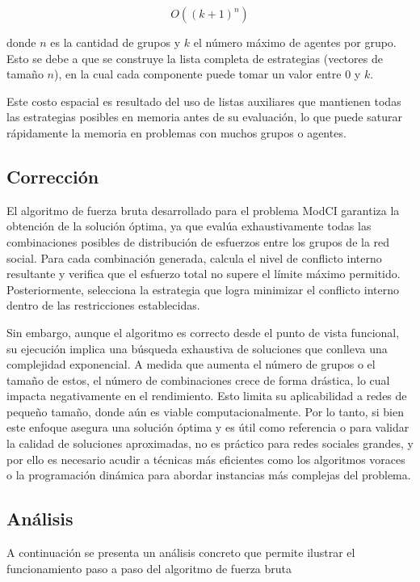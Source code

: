 \documentclass[11pt,letter]{article}
\begin{document}
\[
{O}\left((k+1)^n\right)
\]

donde $n$ es la cantidad de grupos y $k$ el número máximo de agentes por grupo. Esto se debe a que se construye la lista completa de estrategias (vectores de tamaño $n$), en la cual cada componente puede tomar un valor entre $0$ y $k$.

Este costo espacial es resultado del uso de listas auxiliares que mantienen todas las estrategias posibles en memoria antes de su evaluación, lo que puede saturar rápidamente la memoria en problemas con muchos grupos o agentes.

\subsection{Corrección}

El algoritmo de fuerza bruta desarrollado para el problema ModCI garantiza la 
obtención de la solución óptima, ya que evalúa exhaustivamente todas las 
combinaciones posibles de distribución de esfuerzos entre los grupos de la red 
social. Para cada combinación generada, calcula el nivel de conflicto interno 
resultante y verifica que el esfuerzo total no supere el límite máximo permitido. 
Posteriormente, selecciona la estrategia que logra minimizar el conflicto interno 
dentro de las restricciones establecidas. 

Sin embargo, aunque el algoritmo es correcto desde el punto de vista funcional, su 
ejecución implica una búsqueda exhaustiva de soluciones que conlleva una 
complejidad exponencial. A medida que aumenta el número de grupos o el tamaño 
de estos, el número de combinaciones crece de forma drástica, lo cual impacta 
negativamente en el rendimiento. Esto limita su aplicabilidad a redes de pequeño 
tamaño, donde aún es viable computacionalmente. 
Por lo tanto, si bien este enfoque asegura una solución óptima y es útil como 
referencia o para validar la calidad de soluciones aproximadas, no es práctico para 
redes sociales grandes, y por ello es necesario acudir a técnicas más eficientes 
como los algoritmos voraces o la programación dinámica para abordar instancias 
más complejas del problema.

\subsection{Análisis}

A continuación se presenta un análisis concreto que permite ilustrar el funcionamiento paso a paso del algoritmo de fuerza bruta
\end{document}
